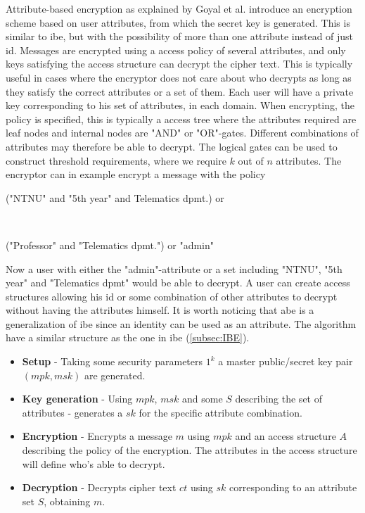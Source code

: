 Attribute-based encryption as explained by Goyal et al. \cite{ABE} introduce an encryption scheme based on user attributes, from which the secret key is generated. This is similar to \gls{ibe}, but with the possibility of more than one attribute instead of just id. Messages are encrypted using a access policy of several attributes, and only keys satisfying the access structure can decrypt the cipher text. This is typically useful in cases where the encryptor does not care about who decrypts as long as they satisfy the correct attributes or a set of them. Each user will have a private key corresponding to his set of attributes, in each domain. When encrypting, the policy is specified, this is typically a access tree where the attributes required are leaf nodes and internal nodes are "AND" or "OR"-gates. Different combinations of attributes may therefore be able to decrypt. The logical gates can be used to construct threshold requirements, where we require $k$ out of $n$ attributes. The encryptor can in example encrypt a message with the policy\\ \centerline{("NTNU" and "5th year" and Telematics dpmt.) or} \\ \centerline{("Professor" and "Telematics dpmt.") or "admin"}
Now a user with either the "admin"-attribute or a set including "NTNU", "5th year" and "Telematics dpmt" would be able to decrypt. A user can create access structures allowing his id or some combination of other attributes to decrypt without having the attributes himself. It is worth noticing that \gls{abe} is a generalization of \gls{ibe} since an identity can be used as an attribute. The algorithm  have a similar structure as the one in \gls{ibe} (\ref{subsec:IBE}).

\begin{itemize}
\item \textbf{ Setup } - Taking some security parameters $1^k$ a master public/secret key pair $(mpk, msk)$ are generated.
\item \textbf{ Key generation } - Using $mpk$, $msk$ and some $S$ describing the set of attributes - generates a $sk$ for the specific attribute combination. 
\item \textbf{ Encryption } - Encrypts a message $m$ using $mpk$ and an access structure $A$ describing the policy of the encryption. The attributes in the access structure will define who's able to decrypt. 
\item \textbf{ Decryption } - Decrypts cipher text $ct$ using $sk$ corresponding to an attribute set $S$, obtaining $m$. 
\end{itemize}


